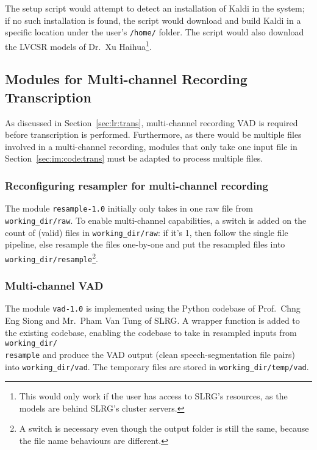 The setup script would attempt to detect an installation of Kaldi in the
system; if no such installation is found, the script would download and
build Kaldi in a specific location under the user's \texttt{/home/} folder.
The script would also download the LVCSR models of Dr.\ Xu Haihua\footnote{
This would only work if the user has access to SLRG's resources, as the
models are behind SLRG's cluster servers.}.

\subsection{Modules for Multi-channel Recording
Transcription}\label{sec:im:code:mctr}

As discussed in Section~\ref{sec:lr:trans}, multi-channel recording VAD
is required before transcription is performed. Furthermore, as there would
be multiple files involved in a multi-channel recording, modules that only
take one input file in Section~\ref{sec:im:code:trans} must be adapted to
process multiple files.

\subsubsection{Reconfiguring resampler for multi-channel recording}

The module \texttt{resample-1.0} initially only takes in one raw file from
\texttt{working\_dir/raw}. To enable multi-channel capabilities, a switch is
added on the count of (valid) files in \texttt{working\_dir/raw}: if it's 1,
then follow the single file pipeline, else resample the files one-by-one and
put the resampled files into \texttt{working\_dir/resample}\footnote{A
switch is necessary even though the output folder is still the same, because
the file name behaviours are different.}.

\subsubsection{Multi-channel VAD}

The module \texttt{vad-1.0} is implemented using the Python codebase of
Prof.\ Chng Eng Siong and Mr.\ Pham Van Tung of SLRG\@. A wrapper function
is added to the existing codebase, enabling the codebase to take in resampled
inputs from \texttt{working\_dir/\\resample} and produce the VAD output
(clean speech-segmentation file pairs) into \texttt{working\_dir/vad}.
The temporary files are stored in \texttt{working\_dir/temp/vad}.

